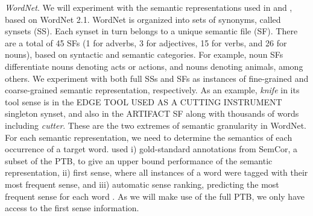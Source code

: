 \documentclass[11pt]{article}
\begin{document}
\emph{WordNet}. We will experiment with the semantic representations used in  and , based on WordNet 2.1. WordNet is organized into sets of synonyms, called synsets (SS). Each synset in turn belongs to a unique semantic file (SF). There are a total of 45 SFs (1 for adverbs, 3 for adjectives, 15 for verbs, and 26 for nouns), based on syntactic and semantic categories. For example, noun SFs differentiate nouns denoting acts or actions, and nouns denoting animals, among others. We experiment with both full SSs and SFs as instances of fine-grained and coarse-grained semantic representation, respectively. As an example, \emph{knife} in its tool sense is in the EDGE TOOL USED AS A CUTTING INSTRUMENT singleton synset, and also in the ARTIFACT SF along with thousands of words including \emph{cutter}. These are the two extremes of semantic granularity in WordNet.
For each semantic representation, we need to determine the semantics of each occurrence of a target word.  used i) gold-standard annotations from SemCor, a subset of the PTB, to give an upper bound performance of the semantic representation, ii) first sense, where all instances of a word were tagged with their most frequent sense, and iii) automatic sense ranking, predicting the most frequent sense for each word  \cite{mccarthy-EtAl:2004:ACL}.
As we will make use of the full PTB, we only have access to the first sense information. %
\end{document}
